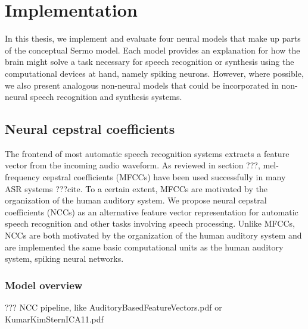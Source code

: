 \chapter{Implementation}

In this thesis, we implement and evaluate
four neural models that make up
parts of the conceptual Sermo model.
Each model provides
an explanation for how the brain might
solve a task necessary for
speech recognition or synthesis
using the computational devices at hand,
namely spiking neurons.
However, where possible,
we also present analogous non-neural models
that could be incorporated in
non-neural speech recognition and synthesis systems.

\section{Neural cepstral coefficients}


The frontend of most automatic speech recognition systems
extracts a feature vector from the incoming audio waveform.
As reviewed in section ???,
mel-frequency cepstral coefficients (MFCCs)
have been used successfully in many ASR systems ???cite.
To a certain extent, MFCCs are motivated
by the organization of the human auditory system.
We propose neural cepstral coefficients (NCCs)
as an alternative feature vector representation
for automatic speech recognition
and other tasks involving speech processing.
Unlike MFCCs, NCCs are both motivated
by the organization of the human auditory system
and are implemented the same basic computational units
as the human auditory system,
spiking neural networks.

\subsection{Model overview}

??? NCC pipeline, like AuditoryBasedFeatureVectors.pdf
or KumarKimSternICA11.pdf

